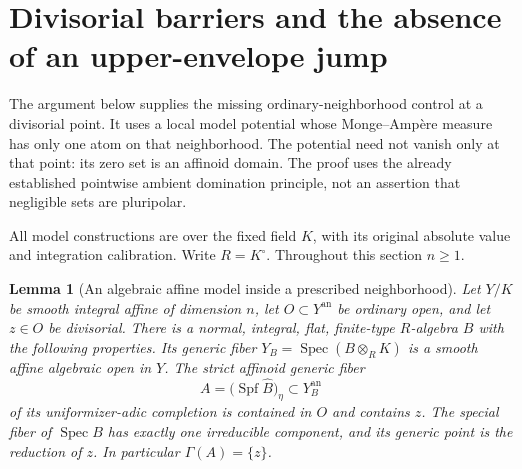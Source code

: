 \documentclass[11pt,a4paper]{article}
\numberwithin{equation}{section}
\newtheorem{lemma}[theorem]{Lemma}
\theoremstyle{definition}
\theoremstyle{remark}
\newcommand{\an}{\mathrm{an}}
\begin{document}
\section{Divisorial barriers and the absence of an upper-envelope jump}
\label{sec:r2-divisorial-no-jump}

The argument below supplies the missing ordinary-neighborhood control
at a divisorial point. It uses a local model potential whose
Monge--Amp\`ere measure has only one atom on that neighborhood. The
potential need not vanish only at that point: its zero set is an
affinoid domain. The proof uses the already established pointwise
ambient domination principle, not an assertion that negligible sets
are pluripolar.

All model constructions are over the fixed field $K$, with its original
absolute value and integration calibration. Write $R=K^\circ$.
Throughout this section $n\geq1$.

\begin{lemma}[An algebraic affine model inside a prescribed neighborhood]
\label{lem:r2-algebraic-one-shilov}
Let $Y/K$ be smooth integral affine of dimension $n$, let
$O\subset Y^{\an}$ be ordinary open, and let $z\in O$ be divisorial.
There is a normal, integral, flat, finite-type $R$-algebra $B$ with
the following properties. Its generic fiber
$Y_B=\operatorname{Spec}(B\otimes_RK)$ is a smooth affine algebraic
open in $Y$. The strict affinoid generic fiber
\[
 A=\bigl(\operatorname{Spf}\widehat B\bigr)_\eta
       \subset Y_B^{\an}
\]
of its uniformizer-adic completion is contained in $O$ and contains
$z$. The special fiber of $\operatorname{Spec}B$ has exactly one
irreducible component, and its generic point is the reduction of
$z$. In particular $\Gamma(A)=\{z\}$.
\end{lemma}
\end{document}
